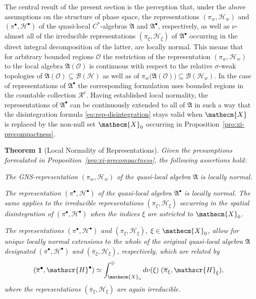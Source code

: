 \documentclass[a4paper,a4paper]{article}
\numberwithin{equation}{section}
\newcommand{\Xecm}{\mathecm{X}}
\newcommand{\Afrak}{\mathfrak{A}}
\newcommand{\Hscr}{\mathscr{H}}
\newcommand{\Oscr}{\mathscr{O}}
\newcommand{\pibar}{\overline{\pi}}
\newcommand{\BH}{\mathscr{B} ( \mathscr{H} )}
\newcommand{\BHw}{\mathscr{B} ( \mathscr{H}_w )}
\newcommand{\AO}{\mathfrak{A} ( \mathscr{O} )}
\newcommand{\Rcount}{\mathscr{R}^c}
\newcommand{\Hbullet}{\mathscr{H}^\bullet}
\newcommand{\Abullet}{\mathfrak{A}^\bullet}
\newcounter{propitem}
\newenvironment{proplist}{\begin{list}{(\roman{propitem})}%
  {\usecounter{propitem} \setlength{\topsep}{0ex}%
   \setlength{\parsep}{0.2ex} \setlength{\itemsep}{0.4ex}%
   \setlength{\leftmargin}{0em} \setlength{\itemindent}{0.5em}%
   }}{\end{list}}
\theoremstyle{definition}
\theoremstyle{plain}
\newtheorem{theorem}[definition]{Theorem}
\theoremstyle{remark}
\theoremstyle{assumption}
\begin{document}
  The central result of the present section is the perception that,
  under the above assumptions on the structure of phase space, the
  representations $( \pi_w , \Hscr_w )$ and $( \pi^\bullet , \Hbullet
  )$ of the quasi-local $C^*$-algebras $\Afrak$ and $\Abullet$,
  respectively, as well as $\nu$-almost all of the irreducible
  representations $( \pi_\xi , \Hscr_\xi )$ of $\Abullet$ occurring in
  the direct integral decomposition of the latter, are locally normal.
  This means that for arbitrary bounded regions $\Oscr$ the
  restriction of the representation $( \pi_w , \Hscr_w )$ to the local
  algebra $\AO$ is continuous with respect to the relative
  $\sigma$-weak topologies of $\AO \subseteq \BH$ as well as of $\pi_w
  \bigl( \AO \bigr) \subseteq \BHw$. In the case of representations of
  $\Abullet$ the corresponding formulation uses bounded regions in the
  countable collection $\Rcount$. Having established local normality,
  the representations of $\Abullet$ can be continuously extended to
  all of $\Afrak$ in such a way that the disintegration formula
  \eqref{eq:rep-disintegration} stays valid when $\Xecm$ is replaced
  by the non-null set $\Xecm_0$ occurring in
  Proposition~\ref{pro:xi-precompactness}.
  \begin{theorem}[Local Normality of Representations]
    \label{the:local-normality}
    Given the presumptions formulated in
    Proposition~\ref{pro:xi-precompactness}, the following assertions
    hold:
    \begin{proplist}
    \item The GNS-representation $( \pi_w , \Hscr_w )$ of the
      quasi-local algebra $\Afrak$ is locally normal.
    \item The representation $( \pi^\bullet , \Hbullet )$ of the
      quasi-local algebra $\Abullet$ is locally normal. The same
      applies to the irreducible representations $( \pi_\xi ,
      \Hscr_\xi )$ occurring in the spatial disintegration of $(
      \pi^\bullet , \Hbullet )$ when the indices $\xi$ are astricted
      to $\Xecm_0$.
    \item The representations $( \pi^\bullet , \Hbullet )$ and $(
      \pi_\xi , \Hscr_\xi )$, $\xi \in \Xecm_0$, allow for unique
      locally normal extensions to the whole of the original
      quasi-local algebra $\Afrak$ designated $( \pibar^\bullet ,
      \Hbullet )$ and $( \pibar_\xi , \Hscr_\xi )$, respectively,
      which are related by
      \begin{equation}
        \label{eq:rep-ext-disintegration}
        ( \pibar^\bullet , \Hbullet ) \simeq \int_{\Xecm_0}^\oplus d
        \nu ( \xi ) \; ( \pibar_\xi , \Hscr_\xi ) \text{,}
      \end{equation}
      where the representations $( \pibar_\xi , \Hscr_\xi )$ are again
      irreducible.
    \end{proplist}
  \end{theorem}
  
\end{document}
